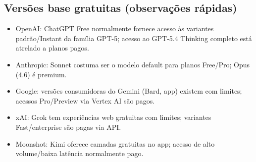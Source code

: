 \documentclass[12pt]{article}
\begin{document}
\subsection*{Versões base gratuitas (observações rápidas)}
\begin{itemize}
    \item OpenAI: ChatGPT Free normalmente fornece acesso às variantes padrão/Instant da família GPT-5; acesso ao GPT-5.4 Thinking completo está atrelado a planos pagos.
    \item Anthropic: Sonnet costuma ser o modelo default para planos Free/Pro; Opus (4.6) é premium.
    \item Google: versões consumidoras do Gemini (Bard, app) existem com limites; acessos Pro/Preview via Vertex AI são pagos.
    \item xAI: Grok tem experiências web gratuitas com limites; variantes Fast/enterprise são pagas via API.
    \item Moonshot: Kimi oferece camadas gratuitas no app; acesso de alto volume/baixa latência normalmente pago.
\end{itemize}
\end{document}
